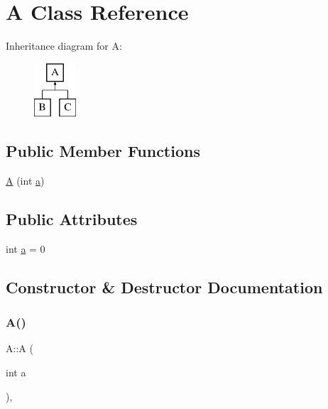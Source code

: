 \hypertarget{class_a}{}\section{A Class Reference}
\label{class_a}
Inheritance diagram for A\+:\begin{figure}[H]
\begin{center}
\leavevmode
\includegraphics[height=2.000000cm]{class_a}
\end{center}
\end{figure}
\subsection*{Public Member Functions}
\begin{DoxyCompactItemize}
\item 
\mbox{\hyperlink{class_a_ac970e0fdad67e6b48c3e6c7fad9b1e50}{A}} (int \mbox{\hyperlink{class_a_a49a53415abd8f1b26235579cc805a15f}{a}})
\end{DoxyCompactItemize}
\subsection*{Public Attributes}
\begin{DoxyCompactItemize}
\item 
int \mbox{\hyperlink{class_a_a49a53415abd8f1b26235579cc805a15f}{a}} = 0
\end{DoxyCompactItemize}


\subsection{Constructor \& Destructor Documentation}
\mbox{\label{class_a_ac970e0fdad67e6b48c3e6c7fad9b1e50}} 
\subsubsection{\texorpdfstring{A()}{A()}}
{\footnotesize\ttfamily A\+::A (\begin{DoxyParamCaption}\item[{int}]{a }\end{DoxyParamCaption})\hspace{0.3cm}{\ttfamily [inline]}, {\ttfamily [explicit]}}



